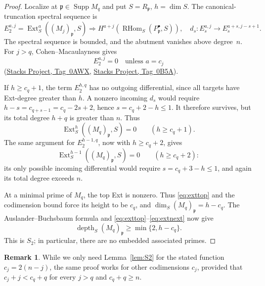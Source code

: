 \documentclass[11pt,letterpaper]{amsart}
\theoremstyle{plain}
\theoremstyle{definition}
\newtheorem{remark}[theorem]{Remark}
\theoremstyle{remark}
\numberwithin{equation}{section}
\DeclareMathOperator{\RHom}{RHom}
\DeclareMathOperator{\Ext}{Ext}
\DeclareMathOperator{\Supp}{Supp}
\DeclareMathOperator{\depth}{depth}
\newcommand{\StacksTag}[1]{\href{https://stacks.math.columbia.edu/tag/#1}{Stacks Project, Tag~#1}}
\begin{document}
\begin{proof}
Localize at $\mathfrak p\in\Supp M_q$ and put $S=R_{\mathfrak p}$,
$h=\dim S$. The canonical-truncation spectral sequence is
\[
 E_2^{a,j}=\Ext_S^a((M_j)_{\mathfrak p},S)
 \Longrightarrow H^{a+j}(\RHom_S(P^\bullet_{\mathfrak p},S)),
 \quad d_s:E_s^{a,j}\to E_s^{a+s,j-s+1}.
\]
The spectral sequence is bounded, and the abutment vanishes above degree~$n$.
For $j>q$, Cohen--Macaulayness gives
\begin{equation}\label{eq:CMext}
 E_2^{a,j}=0\quad\text{unless }a=c_j
\end{equation}
(\StacksTag{0AWX}, \StacksTag{0B5A}).

If $h\ge c_q+1$, the term $E_2^{h,q}$ has no outgoing differential,
since all targets have Ext-degree greater than $h$.
A nonzero incoming $d_s$ would require
$h-s=c_{q+s-1}=c_q-2s+2$, hence $s=c_q+2-h\le1$.
It therefore survives, but its total degree $h+q$ is greater than $n$.
Thus
\begin{equation}\label{eq:exttop}
 \Ext_S^h((M_q)_{\mathfrak p},S)=0\qquad(h\ge c_q+1).
\end{equation}
The same argument for $E_2^{h-1,q}$, now with $h\ge c_q+2$, gives
\begin{equation}\label{eq:extnext}
 \Ext_S^{h-1}((M_q)_{\mathfrak p},S)=0\qquad(h\ge c_q+2):
\end{equation}
its only possible incoming differential would require
$s=c_q+3-h\le1$, and again its total degree exceeds $n$.

At a minimal prime of $M_q$, the top Ext is nonzero. Thus
\eqref{eq:exttop} and the codimension bound force its height to be
$c_q$, and $\dim_S(M_q)_{\mathfrak p}=h-c_q$.
The Auslander--Buchsbaum formula and
\eqref{eq:exttop}--\eqref{eq:extnext} now give
\[
 \depth_S(M_q)_{\mathfrak p}\ge\min\{2,h-c_q\}.
\]
This is $S_2$; in particular, there are no embedded associated primes.
\end{proof}

\begin{remark}
While we only need Lemma~\ref{lem:S2} for the stated function $c_j=2(n-j)$,
the same proof works for other codimensions $c_j$, provided that
$c_j+j<c_q+q$ for every $j>q$ and $c_q+q\ge n$.
\end{remark}
\end{document}
